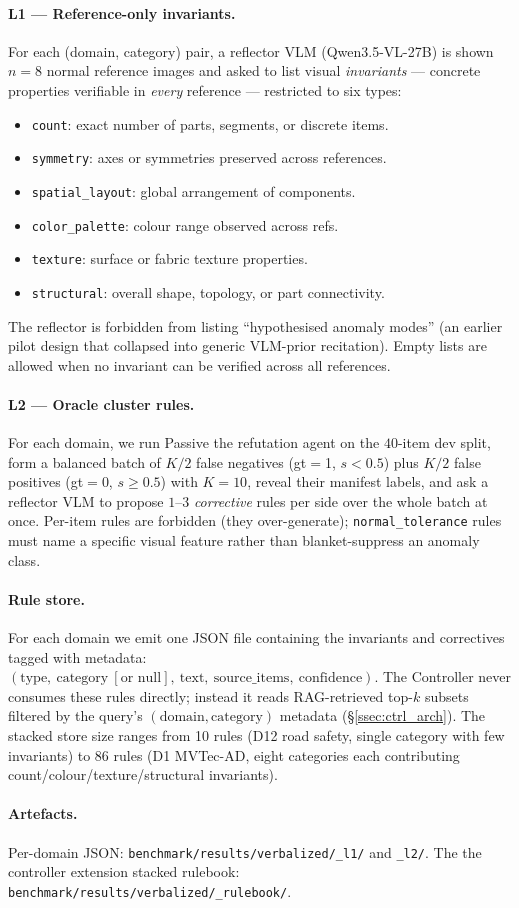 \paragraph{L1 --- Reference-only invariants.}
For each (domain, category) pair, a reflector VLM (Qwen3.5-VL-27B) is shown
$n{=}8$ normal reference images and asked to list visual \emph{invariants}
--- concrete properties verifiable in \emph{every} reference --- restricted
to six types:
\begin{itemize}[topsep=1pt,parsep=0pt,itemsep=1pt]
  \item \texttt{count}: exact number of parts, segments, or discrete items.
  \item \texttt{symmetry}: axes or symmetries preserved across references.
  \item \texttt{spatial\_layout}: global arrangement of components.
  \item \texttt{color\_palette}: colour range observed across refs.
  \item \texttt{texture}: surface or fabric texture properties.
  \item \texttt{structural}: overall shape, topology, or part connectivity.
\end{itemize}
The reflector is forbidden from listing ``hypothesised anomaly modes'' (an
earlier pilot design that collapsed into generic VLM-prior recitation).
Empty lists are allowed when no invariant can be verified across all
references.

\paragraph{L2 --- Oracle cluster rules.}
For each domain, we run Passive the refutation agent on the $40$-item dev split, form a
balanced batch of $K/2$ false negatives (gt$=$1, $s{<}0.5$) plus $K/2$
false positives (gt$=$0, $s{\ge}0.5$) with $K{=}10$, reveal their manifest
labels, and ask a reflector VLM to propose $1$--$3$ \emph{corrective}
rules per side over the whole batch at once. Per-item rules are forbidden
(they over-generate); \texttt{normal\_tolerance} rules must name a specific
visual feature rather than blanket-suppress an anomaly class.

\paragraph{Rule store.}
For each domain we emit one JSON file containing the invariants and
correctives tagged with metadata:
$(\mathrm{type},\ \mathrm{category}\ [\text{or null}],\ \mathrm{text},\ \mathrm{source\_items},\ \mathrm{confidence})$.
The Controller never consumes these rules directly; instead it reads
RAG-retrieved top-$k$ subsets filtered by the query's $(\mathrm{domain},
\mathrm{category})$ metadata (\S\ref{ssec:ctrl_arch}). The stacked store
size ranges from 10 rules (D12 road safety, single category with few
invariants) to 86 rules (D1 MVTec-AD, eight categories each contributing
count/colour/texture/structural invariants).

\paragraph{Artefacts.}
Per-domain JSON: \texttt{benchmark/results/verbalized/\_l1/} and
\texttt{\_l2/}. The  the controller extension stacked rulebook: \texttt{benchmark/results/verbalized/\_rulebook/}.
